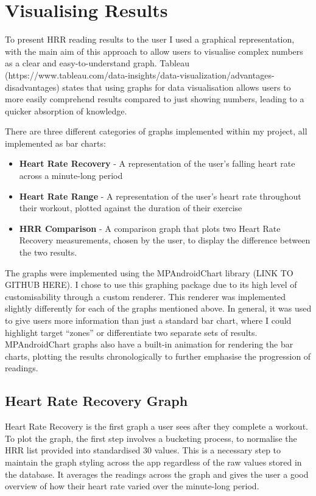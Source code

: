 \documentclass{l4proj}
\begin{document}
\section{Visualising Results}

To present HRR reading results to the user I used a graphical representation, with the main aim of this approach to allow users to visualise complex numbers as a clear and easy-to-understand graph. Tableau (https://www.tableau.com/data-insights/data-visualization/advantages-disadvantages) states that using graphs for data visualisation allows users to more easily comprehend results compared to just showing numbers, leading to a quicker absorption of knowledge.

There are three different categories of graphs implemented within my project, all implemented as bar charts:

\begin{itemize}
    \item \textbf{Heart Rate Recovery} - A representation of the user’s falling heart rate across a minute-long period
    \item \textbf{Heart Rate Range} - A representation of the user’s heart rate throughout their workout, plotted against the duration of their exercise
    \item \textbf{HRR Comparison} - A comparison graph that plots two Heart Rate Recovery measurements, chosen by the user, to display the difference between the two results.
\end{itemize}

The graphs were implemented using the MPAndroidChart library (LINK TO GITHUB HERE). I chose to use this graphing package due to its high level of customisability through a custom renderer. This renderer was implemented slightly differently for each of the graphs mentioned above. In general, it was used to give users more information than just a standard bar chart, where I could highlight target “zones” or differentiate two separate sets of results. MPAndroidChart graphs also have a built-in animation for rendering the bar charts, plotting the results chronologically to further emphasise the progression of readings. 

\subsection{Heart Rate Recovery Graph}

Heart Rate Recovery is the first graph a user sees after they complete a workout. To plot the graph, the first step involves a bucketing process, to normalise the HRR list provided into standardised 30 values. This is a necessary step to maintain the graph styling across the app regardless of the raw values stored in the database. It averages the readings across the graph and gives the user a good overview of how their heart rate varied over the minute-long period. 
\end{document}
